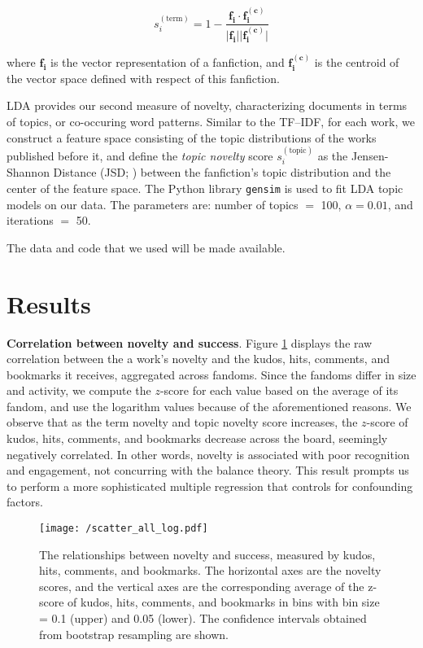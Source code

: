\documentclass[letterpaper]{article} %
\begin{document}
\begin{equation}
s_{i}^{(\mathrm{term})} = 1-\frac{\boldsymbol{f_i} \cdot{\boldsymbol{f_i^{(c)}}}} {\lvert \boldsymbol{f_i} \rvert \lvert \boldsymbol{f_i^{(c)}} \rvert}
\end{equation}

where $\boldsymbol{f_i}$ is the vector representation of a fanfiction, and $\boldsymbol{f_i^{(c)}}$ is the centroid of the vector space defined with respect of this fanfiction.

LDA provides our second measure of novelty, characterizing documents in terms of topics, or co-occuring word patterns. Similar to the TF--IDF, for each work, we construct a feature space consisting of the topic distributions of the works published before it, and define the \emph{topic novelty} score $s_{i}^{(\mathrm{topic})}$ as the Jensen-Shannon Distance (JSD; \cite{klingenstein2014civilizing}) between the fanfiction's topic distribution and the center of the feature space. The Python library \texttt{gensim} is used to fit LDA topic models on our data. The parameters are: number of topics $=$ 100, $\alpha = 0.01$, and iterations $=$ 50.

The data and code that we used will be made available.

\section{Results}

\textbf{Correlation between novelty and success}. Figure \ref{fig:tfidf_lda_kudos} displays the raw correlation between the a work's novelty and the kudos, hits, comments, and bookmarks it receives, aggregated across fandoms. Since the fandoms differ in size and activity, we compute the $z$-score for each value based on the average of its fandom, and use the logarithm values because of the aforementioned reasons. We observe that as the term novelty and topic novelty score increases, the $z$-score of kudos, hits, comments, and bookmarks decrease across the board, seemingly negatively correlated. In other words, novelty is associated with poor recognition and engagement, not concurring with the balance theory. This result prompts us to perform a more sophisticated multiple regression that controls for confounding factors.


 \begin{figure}[h]
    \centering
          \texttt{[image: /scatter\_all\_log.pdf]}
        \caption{The relationships between novelty and success, measured by kudos, hits, comments, and bookmarks. The horizontal axes are the novelty scores, and the vertical axes are the corresponding average of the z-score of kudos, hits, comments, and bookmarks in bins with bin size = 0.1 (upper) and 0.05 (lower). The confidence intervals obtained from bootstrap resampling are shown. }
        \label{fig:tfidf_lda_kudos}
\end{figure}
\end{document}
